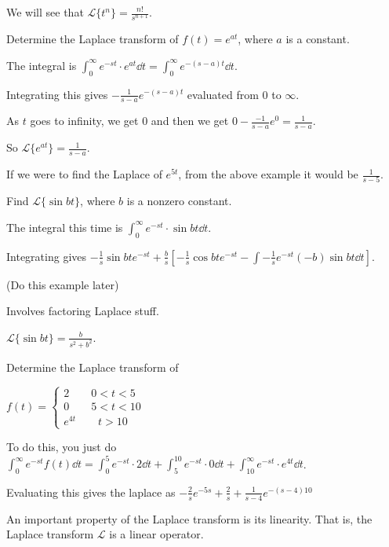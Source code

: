 \documentclass[../diffeq.tex]{subfiles}
\begin{document}
We will see that $\mathcal{L}\{t^n\} = \frac{n!}{s^{n+1}}$.

\begin{example}
    Determine the Laplace transform of $f(t)=e^{at}$, where $a$ is a constant.

    The integral is $\int_0^{\infty}e^{-st}\cdot e^{at}\dd t = \int_0^{\infty}e^{-(s-a)t}\dd t$.

    Integrating this gives $-\frac{1}{s-a}e^{-(s-a)t}$ evaluated from $0$ to $\infty$.

    As $t$ goes to infinity, we get $0$ and then we get $0-\frac{-1}{s-a}e^0 = \frac{1}{s-a}$.

    So $\mathcal{L}\{e^{at}\}=\frac{1}{s-a}$.
\end{example}

If we were to find the Laplace of $e^{5t}$, from the above example it would be $\frac{1}{s-5}$.

\begin{example}
    Find $\mathcal{L}\{\sin bt\}$, where $b$ is a nonzero constant.

    The integral this time is $\int_0^{\infty}e^{-st}\cdot\sin bt \dd t$.

    Integrating gives $-\frac{1}{s}\sin bt e^{-st}+\frac{b}{s}\left[-\frac{1}{s}\cos bt e^{-st}-\int -\frac{1}{s}e^{-st}(-b)\sin bt \dd t \right]$.

    (Do this example later)

    Involves factoring Laplace stuff.

    $\mathcal{L}\{\sin bt\} = \frac{b}{s^2+b^2}$.
\end{example}

\begin{example}
    Determine the Laplace transform of 

    $f(t)=\begin{cases}
        2 \qquad 0<t<5 \\ 
        0 \qquad 5<t<10 \\
        e^{4t} \qquad t>10
    \end{cases}$

    To do this, you just do $\int_0^{\infty}e^{-st}f(t)\dd t = \int_0^5 e^{-st}\cdot 2 \dd t + \int_5^{10}e^{-st}\cdot 0 \dd t + \int_10^{\infty}e^{-st}\cdot e^{4t}\dd t$.

    Evaluating this gives the laplace as $-\frac{2}{s}e^{-5s}+\frac{2}{s}+\frac{1}{s-4}e^{-(s-4)10}$
\end{example}

An important property of the Laplace transform is its linearity. That is, the Laplace transform $\mathcal{L}$ is a linear operator.
\end{document}
